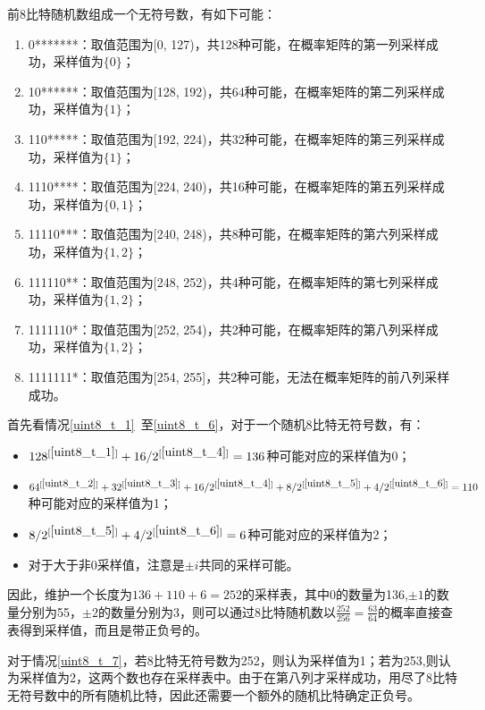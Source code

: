 \documentclass{article}
\begin{document}
	
	前8比特随机数组成一个无符号数，有如下可能：
	\begin{enumerate}
		\item 0*******：取值范围为[0, 127)，共128种可能，在概率矩阵的第一列采样成功，采样值为$\{0\}$；\label{uint8_t_1}
		\item 10******：取值范围为[128, 192)，共64种可能，在概率矩阵的第二列采样成功，采样值为$\{1\}$；\label{uint8_t_2}
		\item 110*****：取值范围为[192, 224)，共32种可能，在概率矩阵的第三列采样成功，采样值为$\{1\}$；\label{uint8_t_3}
		\item 1110****：取值范围为[224, 240)，共16种可能，在概率矩阵的第五列采样成功，采样值为$\{0, 1\}$；\label{uint8_t_4}
		\item 11110***：取值范围为[240, 248)，共8种可能，在概率矩阵的第六列采样成功，采样值为$\{1, 2\}$；\label{uint8_t_5}
		\item 111110**：取值范围为[248, 252)，共4种可能，在概率矩阵的第七列采样成功，采样值为$\{1, 2\}$；\label{uint8_t_6}
		\item 1111110*：取值范围为[252, 254)，共2种可能，在概率矩阵的第八列采样成功，采样值为$\{1, 2\}$；\label{uint8_t_7}
		\item 1111111*：取值范围为[254, 255]，共2种可能，无法在概率矩阵的前八列采样成功。\label{uint8_t_8}
	\end{enumerate}
	首先看情况\ref{uint8_t_1}~至\ref{uint8_t_6}，对于一个随机8比特无符号数，有：
	\begin{itemize}
		\item $128^{[\ref{uint8_t_1}]} + 16/2^{[\ref{uint8_t_4}]} = 136$种可能对应的采样值为0；
		\item $64^{[\ref{uint8_t_2}]} + 32^{[\ref{uint8_t_3}]} + 16/2^{[\ref{uint8_t_4}]} + 8/2^{[\ref{uint8_t_5}]} + 4/2^{[\ref{uint8_t_6}]} = 110$种可能对应的采样值为1；
		\item $8/2^{[\ref{uint8_t_5}]} + 4/2^{[\ref{uint8_t_6}]} = 6$种可能对应的采样值为2；
		\item 对于大于非0采样值，注意是$\pm i$共同的采样可能。
	\end{itemize}
	因此，维护一个长度为$136 + 110 + 6 = 252$的采样表，其中0的数量为136,$\pm1$的数量分别为55，$\pm2$的数量分别为3，则可以通过8比特随机数以$\frac{252}{256} = \frac{63}{64}$的概率直接查表得到采样值，而且是带正负号的。
	
	对于情况\ref{uint8_t_7}，若8比特无符号数为252，则认为采样值为1；若为253,则认为采样值为2，这两个数也存在采样表中。由于在第八列才采样成功，用尽了8比特无符号数中的所有随机比特，因此还需要一个额外的随机比特确定正负号。
	
\end{document}
